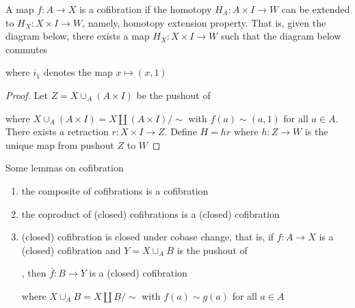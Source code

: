 \documentclass{report}
\begin{document}
\begin{definition}[cofibration]
    A map $f: A \to X$ is a cofibration if the homotopy $H_A: A \times I \to W$ can be extended to $H_X: X \times I \to W$, namely, homotopy extension property. That is, given the diagram below, there exists a map $H_X: X \times I \to W$ such that the diagram below commutes
    \begin{center}
    \end{center}
    where $i_1$ denotes the map $x \mapsto (x, 1)$
\end{definition}

\begin{proof}
    Let $Z = X \cup_A (A \times I)$ be the pushout of  where $X \cup_A (A \times I) = X \amalg (A \times I) / \sim$ with $f(a) \sim (a, 1)$ for all $a \in A$. There exists a retraction $r: X \times I \to Z$. Define $H = h r$ where $h: Z \to W$ is the unique map from pushout $Z$ to $W$
\end{proof}

\begin{lemma}
    Some lemmas on cofibration
    \begin{enumerate}
        \item the composite of cofibrations is a cofibration
        \item the coproduct of (closed) cofibrations is a (closed) cofibration
        \item (closed) cofibration is closed under cobase change, that is, if $f: A \to X$ is a (closed) cofibration and $Y = X \cup_A B$ is the pushout of , then $\overline{f}: B \to Y$ is a (closed) cofibration
        \begin{center}
        \end{center}
        where $X \cup_A B = X \amalg B / \sim$ with $f(a) \sim g(a)$ for all $a \in A$
    \end{enumerate}
\end{lemma}
\end{document}
